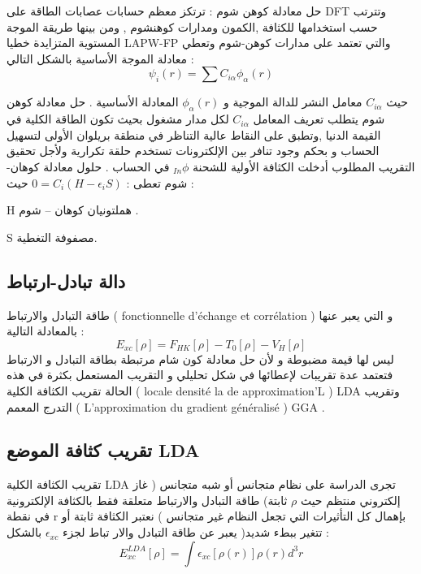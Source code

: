 حل معادلة كوهن شوم : ترتكز معظم حسابات عصابات الطاقة على DFT وتترتب حسب استخدامها  للكثافة ,الكمون ومدارات كوهنشوم , ومن بينها طريقة الموجة المستوية المتزايدة خطيا LAPW-FP والتي تعتمد على  مدارات كوهن-شوم وتعطي معادلة الموجة الأساسية بالشكل التالي :
\begin{equation}\label{key}
	\psi_{i} (r) = \sum C_{i\alpha} \phi_{\alpha} (r)
\end{equation}

حيث $ C_{i\alpha} $ معامل النشر للدالة الموجية و $ \phi_{\alpha} (r) $ المعادلة الأساسية .
حل معادلة كوهن شوم يتطلب تعريف المعامل $ C_{i\alpha} $  لكل مدار مشغول بحيث تكون الطاقة الكلية في القيمة الدنيا ,وتطبق على النقاط عالية التناظر في منطقة  بريلوان الأولى لتسهيل الحساب و بحكم وجود تنافر بين الإلكترونات تستخدم حلقة  تكرارية ولأجل تحقيق التقريب المطلوب أدخلت الكثافة الأولية للشحنة  $ _{In}\phi  $ في الحساب .  
حلول معادلة كوهان-شوم تعطى : $ 0 = C_{i} ( H - \epsilon_{i} S ) $
حيث :
\begin{list}{}{}
	\item 
	H هملتونيان كوهان – شوم .
	\item
	S مصفوفة التغطية.
	
\end{list}

\subsection{ دالة تبادل-ارتباط }
طاقة التبادل والارتباط ( fonctionnelle d'échange et corrélation ) و التي يعبر عنها بالمعادلة التالية :
\begin{equation}\label{}
	E_{xc} \left[\rho\right] = F_{HK} \left[\rho\right] - T_{0} \left[\rho\right] - V_{H} \left[\rho\right]	
\end{equation}
ليس لها قيمة مضبوطة و لأن حل معادلة كون شام مرتبطة بطاقة التبادل و الارتباط فتعتمد عدة  تقريبات لإعطائها في شكل تحليلي و التقريب المستعمل بكثرة  في هذه الحالة تقريب الكثافة الكلية ( locale densité la de approximation'L ) LDA وتقريب التدرج  المعمم ( L'approximation du gradient généralisé ) GGA .

\subsection{ تقريب كثافة الموضع LDA }
تقريب الكثافة الكلية LDA تجرى الدراسة على نظام متجانس أو شبه متجانس ( غاز إلكتروني منتظم  حيث $ \rho $  ثابتة) طاقة التبادل والارتباط متعلقة فقط بالكثافة الإلكترونية في نقطة  r  بإهمال كل التأثيرات التي تجعل النظام غير متجانس ) نعتبر الكثافة ثابتة أو تتغير ببطء شديد( يعبر عن طاقة التبادل والار تباط لجزء $ \epsilon_{xc} $ بالشكل :
\begin{equation}\label{}
	E_{xc}^{LDA} \left[\rho\right] =  \int  \epsilon_{xc} \left[\rho (r) \right] \rho (r) d^{3}r
\end{equation}

